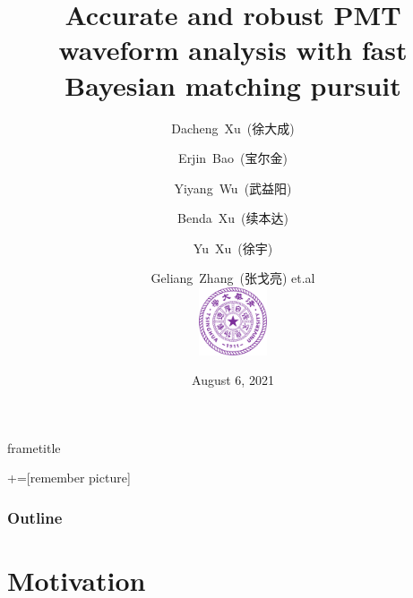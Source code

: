 \documentclass{beamer}
\title[Waveform Analysis]{Accurate and robust PMT waveform analysis with fast Bayesian matching pursuit}
\date[JUNO]{August 6, 2021}
\begin{document}
{\begin{beamercolorbox}[wd=\paperwidth]{frametitle}
    \strut\hspace{0.5em}\insertframetitle\strut
    \hfill
\end{beamercolorbox}
}
+=[remember picture]

\begin{CJK*}{UTF8}{gbsn}
\author[Dacheng Xu]{Dacheng~Xu~(徐大成) \and Erjin~Bao~(宝尔金) \and Yiyang~Wu~(武益阳) \and Benda~Xu~(续本达) \and Yu~Xu~(徐宇) \and Geliang~Zhang~(张戈亮) et.al \\ [4mm] \includegraphics[height=2cm]{img/Tsinghua_University_Logo.png}}

\frame{\titlepage}

\begin{frame}[noframenumbering]
\frametitle{Outline}
\thispagestyle{empty}
\tableofcontents
\end{frame}

\section{Motivation}


\end{CJK*}
\end{document}
